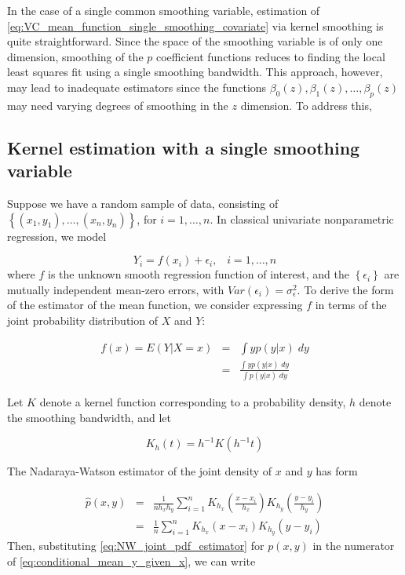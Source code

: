 \documentclass[12pt]{article}
\begin{document}
{In the case of a single common smoothing variable, estimation of \ref{eq:VC_mean_function_single_smoothing_covariate} via kernel smoothing is quite straightforward. Since the space of the smoothing variable is of only one dimension, smoothing of the $p$ coefficient functions reduces to finding the local least squares fit using a single smoothing bandwidth. This approach, however, may lead to inadequate estimators since the functions $\beta_0\left(z\right), \beta_1\left(z\right), \dots, \beta_p\left(z\right)$ may need varying degrees of smoothing in the $z$ dimension. To address this, 

\subsection{Kernel estimation with a single smoothing variable}

Suppose we have a random sample of data, consisting of $\left\{ \left(x_1, y_1\right),\dots, \left(x_n, y_n\right)\right\}$, for $i=1,\dots,n$. In classical univariate nonparametric regression, we model 

\begin{equation}
Y_i = f\left(x_i\right) + \epsilon_i,\;\;\;i=1,\dots, n \label{eq:classical_NP_regression_model}
\end{equation} 
\noindent
where $f$ is the unknown smooth regression function of interest, and the $\left\{ \epsilon_i \right\}$ are mutually independent mean-zero errors, with $Var\left(\epsilon_i\right)=\sigma_\epsilon^2$. To derive the form of the estimator of the mean function, we consider expressing $f$ in terms of the joint probability distribution of $X$ and $Y$:

\begin{eqnarray} 
f\left(x\right) = E\left(Y \vert X=x\right) &=& \int yp(y \vert x)\;dy \nonumber \\
&=& \frac{ \int yp(y \vert x)\;dy }{ \int p(y \vert x)\;dy } \label{eq:conditional_mean_y_given_x}
\end{eqnarray}
 
Let $K$ denote a kernel function corresponding to a probability density, $h$ denote the smoothing bandwidth, and let 

\[
K_h\left(t\right) = h^{-1} K\left(h^{-1} t \right)
\] 

The Nadaraya-Watson estimator of the joint density of $x$ and $y$ has form

\begin{eqnarray} 
\hat{p}\left(x,y\right) &=& \frac{1}{nh_x h_y}\sum_{i=1}^{n} K_{h_x}\left(\frac{x-x_i}{h_x}\right) K_{h_y}\left(\frac{y-y_i}{h_y}\right)  \nonumber \\ 
&=& \frac{1}{n}\sum_{i=1}^{n} K_{h_x}\left(x-x_i\right) K_{h_y}\left(y-y_i\right) \label{eq:NW_joint_pdf_estimator} 
\end{eqnarray}
\noindent
Then, substituting \ref{eq:NW_joint_pdf_estimator} for $p\left(x,y\right)$ in the numerator of \ref{eq:conditional_mean_y_given_x}, we can write 

}
\end{document}
